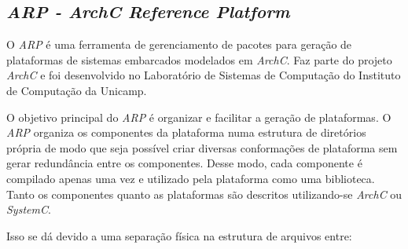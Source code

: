 \documentclass[10pt,a4paper]{article}
\begin{document}
\subsection{\textit{ARP - ArchC Reference Platform}}
O \textit{ARP}\cite{arp} é uma ferramenta de gerenciamento de pacotes para
geração de plataformas de sistemas embarcados modelados em
\textit{ArchC}\cite{archc,TR-IC-03-15,Rigo2004SBAC}. Faz parte do projeto \textit{ArchC} e foi desenvolvido
no Laboratório de Sistemas de Computação do Instituto de Computação da
Unicamp.

O objetivo principal do \textit{ARP} é organizar e facilitar a geração
de plataformas. O \textit{ARP} organiza os componentes da plataforma
numa estrutura de diretórios própria de modo que seja possível criar
diversas conformações de plataforma sem gerar redundância entre os
componentes. Desse modo,
cada componente é compilado apenas uma vez e utilizado pela plataforma
como uma biblioteca. Tanto os componentes quanto as plataformas são
descritos utilizando-se \textit{ArchC} ou \textit{SystemC}.

Isso se dá devido a uma separação física na estrutura de
arquivos entre:
\end{document}
